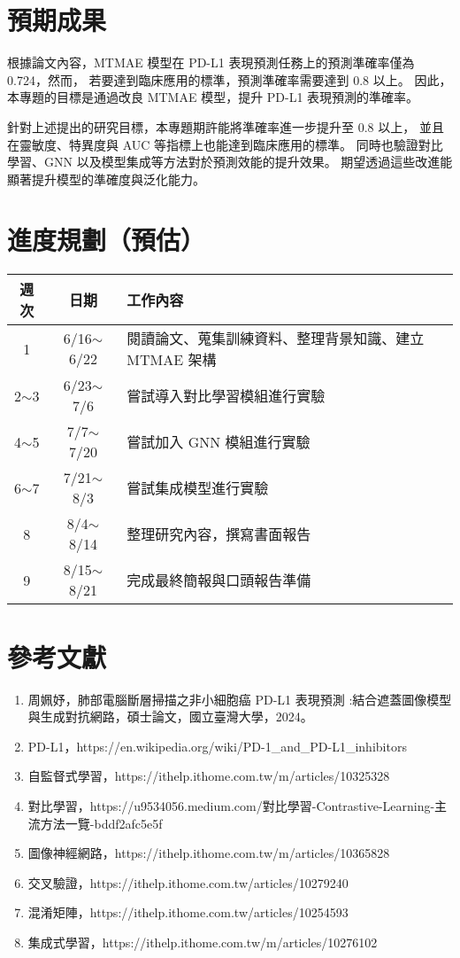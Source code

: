 \documentclass[12pt,a4paper]{article}
\begin{document}
\section{預期成果}
根據論文內容，MTMAE 模型在 PD-L1 表現預測任務上的預測準確率僅為 0.724，然而，
若要達到臨床應用的標準，預測準確率需要達到 0.8 以上。
因此，本專題的目標是通過改良 MTMAE 模型，提升 PD-L1 表現預測的準確率。

針對上述提出的研究目標，本專題期許能將準確率進一步提升至 0.8 以上，
並且在靈敏度、特異度與 AUC 等指標上也能達到臨床應用的標準。
同時也驗證對比學習、GNN 以及模型集成等方法對於預測效能的提升效果。
期望透過這些改進能顯著提升模型的準確度與泛化能力。

\section{進度規劃（預估）}
\begin{tabular}{|c|c |l|  }
    \hline
    週次 & 日期 & 工作內容 \\
    \hline\hline
    1 & 6/16$\sim$6/22 & 閱讀論文、蒐集訓練資料、整理背景知識、建立 MTMAE 架構 \\
    \hline
    2$\sim$3 & 6/23$\sim$7/6 & 嘗試導入對比學習模組進行實驗 \\
    \hline
    4$\sim$5 & 7/7$\sim$7/20 & 嘗試加入 GNN 模組進行實驗 \\
    \hline
    6$\sim$7 & 7/21$\sim$8/3 & 嘗試集成模型進行實驗 \\
    \hline
    8 & 8/4$\sim$8/14 & 整理研究內容，撰寫書面報告 \\
    \hline
    9 & 8/15$\sim$8/21 & 完成最終簡報與口頭報告準備 \\
    \hline
\end{tabular}

\section{參考文獻}
\begin{enumerate}
    \item 周姵妤，肺部電腦斷層掃描之非小細胞癌 PD-L1 表現預測 :結合遮蓋圖像模型與生成對抗網路，碩士論文，國立臺灣大學，2024。
    \item PD-L1，https://en.wikipedia.org/wiki/PD-1\_and\_PD-L1\_inhibitors
    \item 自監督式學習，https://ithelp.ithome.com.tw/m/articles/10325328
    \item 對比學習，https://u9534056.medium.com/對比學習-Contrastive-Learning-主流方法一覽-bddf2afc5e5f
    \item 圖像神經網路，https://ithelp.ithome.com.tw/m/articles/10365828
    \item 交叉驗證，https://ithelp.ithome.com.tw/articles/10279240
    \item 混淆矩陣，https://ithelp.ithome.com.tw/articles/10254593
    \item 集成式學習，https://ithelp.ithome.com.tw/m/articles/10276102
\end{enumerate}
\end{document}
